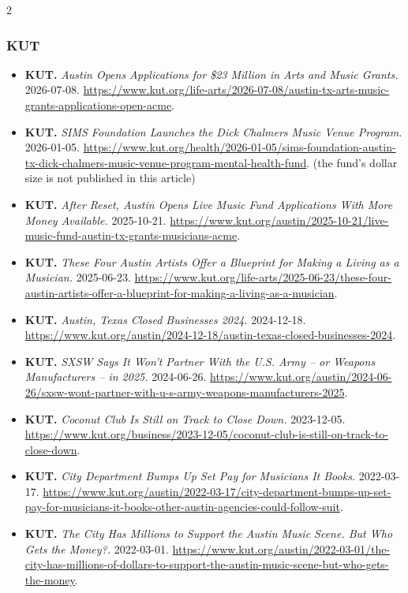 {\begin{multicols}{2}
\subsubsection*{KUT}
\begin{itemize}[itemsep=0pt,topsep=1pt,parsep=0pt,partopsep=0pt,leftmargin=1em]
\item \textbf{KUT.} \textit{Austin Opens Applications for \$23 Million in Arts and Music Grants.} 2026-07-08. \url{https://www.kut.org/life-arts/2026-07-08/austin-tx-arts-music-grants-applications-open-acme}.
\item \textbf{KUT.} \textit{SIMS Foundation Launches the Dick Chalmers Music Venue Program.} 2026-01-05. \url{https://www.kut.org/health/2026-01-05/sims-foundation-austin-tx-dick-chalmers-music-venue-program-mental-health-fund}. {\color{ammuted}(the fund’s dollar size is not published in this article)}
\item \textbf{KUT.} \textit{After Reset, Austin Opens Live Music Fund Applications With More Money Available.} 2025-10-21. \url{https://www.kut.org/austin/2025-10-21/live-music-fund-austin-tx-grants-musicians-acme}.
\item \textbf{KUT.} \textit{These Four Austin Artists Offer a Blueprint for Making a Living as a Musician.} 2025-06-23. \url{https://www.kut.org/life-arts/2025-06-23/these-four-austin-artists-offer-a-blueprint-for-making-a-living-as-a-musician}.
\item \textbf{KUT.} \textit{Austin, Texas Closed Businesses 2024.} 2024-12-18. \url{https://www.kut.org/austin/2024-12-18/austin-texas-closed-businesses-2024}.
\item \textbf{KUT.} \textit{SXSW Says It Won’t Partner With the U.S. Army – or Weapons Manufacturers – in 2025.} 2024-06-26. \url{https://www.kut.org/austin/2024-06-26/sxsw-wont-partner-with-u-s-army-weapons-manufacturers-2025}.
\item \textbf{KUT.} \textit{Coconut Club Is Still on Track to Close Down.} 2023-12-05. \url{https://www.kut.org/business/2023-12-05/coconut-club-is-still-on-track-to-close-down}.
\item \textbf{KUT.} \textit{City Department Bumps Up Set Pay for Musicians It Books.} 2022-03-17. \url{https://www.kut.org/austin/2022-03-17/city-department-bumps-up-set-pay-for-musicians-it-books-other-austin-agencies-could-follow-suit}.
\item \textbf{KUT.} \textit{The City Has Millions to Support the Austin Music Scene. But Who Gets the Money?.} 2022-03-01. \url{https://www.kut.org/austin/2022-03-01/the-city-has-millions-of-dollars-to-support-the-austin-music-scene-but-who-gets-the-money}.

\end{itemize}
\end{multicols}}
